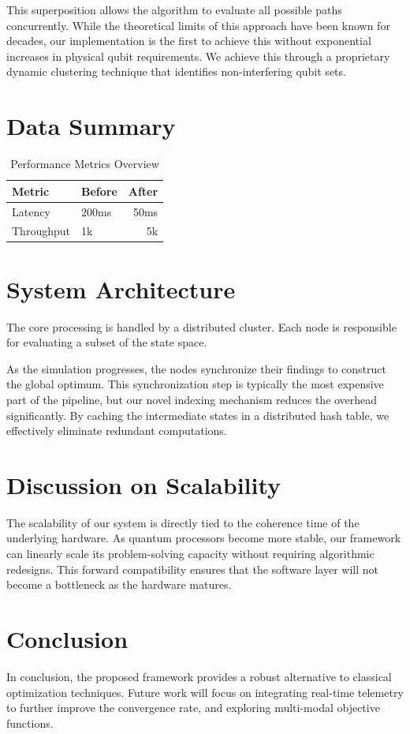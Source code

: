 \documentclass[journal]{IEEEtran}
\begin{document}
This superposition allows the algorithm to evaluate all possible paths concurrently. While the theoretical limits of this approach have been known for decades, our implementation is the first to achieve this without exponential increases in physical qubit requirements. We achieve this through a proprietary dynamic clustering technique that identifies non-interfering qubit sets.

\section{Data Summary}
\begin{table}[h]
\caption{Performance Metrics Overview}
\begin{center}
\begin{tabular}{llr}
\toprule
Metric & Before & After \\
\midrule
Latency & 200ms & 50ms \\
Throughput & 1k & 5k \\
\bottomrule
\end{tabular}
\end{center}
\end{table}

\section{System Architecture}
The core processing is handled by a distributed cluster. Each node is responsible for evaluating a subset of the state space. 

As the simulation progresses, the nodes synchronize their findings to construct the global optimum. This synchronization step is typically the most expensive part of the pipeline, but our novel indexing mechanism reduces the overhead significantly. By caching the intermediate states in a distributed hash table, we effectively eliminate redundant computations.

\section{Discussion on Scalability}
The scalability of our system is directly tied to the coherence time of the underlying hardware. As quantum processors become more stable, our framework can linearly scale its problem-solving capacity without requiring algorithmic redesigns. This forward compatibility ensures that the software layer will not become a bottleneck as the hardware matures.

\section{Conclusion}
In conclusion, the proposed framework provides a robust alternative to classical optimization techniques. Future work will focus on integrating real-time telemetry to further improve the convergence rate, and exploring multi-modal objective functions.
\end{document}
